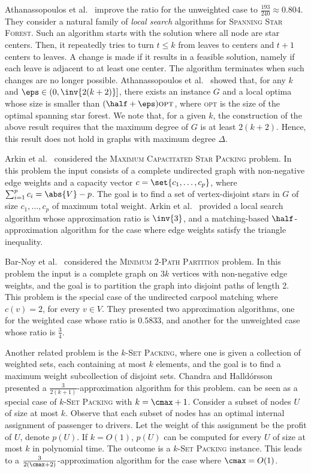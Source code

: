 Athanassopoulos et al.~\cite{ACKK09} improve the ratio for the
unweighted case to $\frac{193}{240} \approx 0.804$.
%
They consider a natural family of \emph{local search} algorithms
for \textsc{Spanning Star Forest}.  Such an algorithm starts with the
solution where all node are star centers.  Then, it repeatedly tries
to turn $t \leq k$ from leaves to centers and $t+1$ centers to leaves.
A change is made if it results in a feasible solution, namely if each
leave is adjacent to at least one center.  The algorithm terminates
when such changes are no longer possible.
%
Athanassopoulos et al.~\cite{ACKK09} showed that, for any $k$ and
$\eps \in (0,\inv{2(k+2)}]$, there exists an instance $G$ and a local
optima whose size is smaller than $(\half + \eps) \textsc{opt}$,
where \textsc{opt} is the size of the optimal spanning star forest.
We note that, for a given $k$, the construction of the above result
requires that the maximum degree of $G$ is at least $2(k+2)$.  Hence,
this result does not hold in graphs with maximum degree $\Delta$.

Arkin et al.~\cite{arkin2004approximations} considered
the \textsc{Maximum Capacitated Star Packing} problem.  In this
problem the input consists of a complete undirected graph with
non-negative edge weights and a capacity vector $c
= \set{c_1,\ldots,c_p}$, where $\sum_{i=1}^p c_i = \abs{V} - p$.  The
goal is to find a set of vertex-disjoint stars in $G$ of size
$c_1,\ldots,c_p$ of maximum total weight.  Arkin et
al.~\cite{arkin2004approximations} provided a local search algorithm
whose approximation ratio is $\inv{3}$, and a matching-based
$\half$-approximation algorithm for the case where edge weights
satisfy the triangle inequality.

Bar-Noy et al.~\cite{bar2015improved} considered the
\textsc{Minimum $2$-Path Partition} problem.
In this problem the input is a complete graph on $3k$ vertices with
non-negative edge weights, and the goal is to partition the graph into
disjoint paths of length 2.  This problem is the special case of the
undirected carpool matching where $c(v) = 2$, for every $v \in V$.
They presented two approximation algorithms, one for the weighted case
whose ratio is $0.5833$, and another for the unweighted case whose
ratio is $\frac{3}{4}$.

Another related problem is the \textsc{$k$-Set Packing}, where one is
given a collection of weighted sets, each containing at most $k$
elements, and the goal is to find a maximum weight subcollection of
disjoint sets.  Chandra and Halld\'orsson~\cite{chandra2001greedy}
presented a $\frac{3}{2(k+1)}$-approximation algorithm for this
problem.
%
\carpool can be seen as a special case of \textsc{$k$-Set Packing}
with $k = \cmax + 1$.  Consider a subset of nodes $U$ of size at most
$k$.  Observe that each subset of nodes has an optimal internal
assignment of passenger to drivers.  Let the weight of this assignment
be the profit of $U$, denote $p(U)$.  If $k = O(1)$, $p(U)$ can be
computed for every $U$ of size at most $k$ in polynomial time.  The
outcome is a \textsc{$k$-Set Packing} instance.  This leads to a
$\frac{3}{2(\cmax+2)}$-approximation algorithm for the case where
$\cmax = O(1)$.



